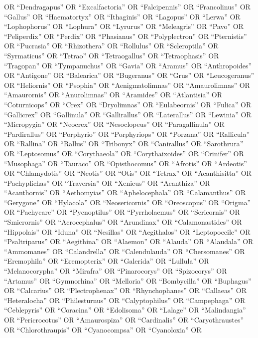 \documentclass[
  number,
  review,
  onecolumn]{elsarticle}
\begin{document}
OR ``Dendragapus'' OR ``Excalfactoria'' OR ``Falcipennis'' OR
``Francolinus'' OR ``Gallus'' OR ``Haematortyx'' OR ``Ithaginis'' OR
``Lagopus'' OR ``Lerwa'' OR ``Lophophorus'' OR ``Lophura'' OR
``Lyrurus'' OR ``Meleagris'' OR ``Pavo'' OR ``Peliperdix'' OR ``Perdix''
OR ``Phasianus'' OR ``Polyplectron'' OR ``Pternistis'' OR ``Pucrasia''
OR ``Rhizothera'' OR ``Rollulus'' OR ``Scleroptila'' OR ``Syrmaticus''
OR ``Tetrao'' OR ``Tetraogallus'' OR ``Tetraophasis'' OR ``Tragopan'' OR
``Tympanuchus'' OR ``Gavia'' OR ``Aramus'' OR ``Anthropoides'' OR
``Antigone'' OR ``Balearica'' OR ``Bugeranus'' OR ``Grus'' OR
``Leucogeranus'' OR ``Heliornis'' OR ``Psophia'' OR ``Aenigmatolimnas''
OR ``Amaurolimnas'' OR ``Amaurornis'' OR ``Anurolimnas'' OR ``Aramides''
OR ``Atlantisia'' OR ``Coturnicops'' OR ``Crex'' OR ``Dryolimnas'' OR
``Eulabeornis'' OR ``Fulica'' OR ``Gallicrex'' OR ``Gallinula'' OR
``Gallirallus'' OR ``Laterallus'' OR ``Lewinia'' OR ``Micropygia'' OR
``Neocrex'' OR ``Nesoclopeus'' OR ``Paragallinula'' OR ``Pardirallus''
OR ``Porphyrio'' OR ``Porphyriops'' OR ``Porzana'' OR ``Rallicula'' OR
``Rallina'' OR ``Rallus'' OR ``Tribonyx'' OR ``Canirallus'' OR
``Sarothrura'' OR ``Leptosomus'' OR ``Corythaeola'' OR
``Corythaixoides'' OR ``Crinifer'' OR ``Musophaga'' OR ``Tauraco'' OR
``Opisthocomus'' OR ``Afrotis'' OR ``Ardeotis'' OR ``Chlamydotis'' OR
``Neotis'' OR ``Otis'' OR ``Tetrax'' OR ``Acanthisitta'' OR
``Pachyplichas'' OR ``Traversia'' OR ``Xenicus'' OR ``Acanthiza'' OR
``Acanthornis'' OR ``Aethomyias'' OR ``Aphelocephala'' OR
``Calamanthus'' OR ``Gerygone'' OR ``Hylacola'' OR ``Neosericornis'' OR
``Oreoscopus'' OR ``Origma'' OR ``Pachycare'' OR ``Pycnoptilus'' OR
``Pyrrholaemus'' OR ``Sericornis'' OR ``Smicrornis'' OR ``Acrocephalus''
OR ``Arundinax'' OR ``Calamonastides'' OR ``Hippolais'' OR ``Iduna'' OR
``Nesillas'' OR ``Aegithalos'' OR ``Leptopoecile'' OR ``Psaltriparus''
OR ``Aegithina'' OR ``Alaemon'' OR ``Alauda'' OR ``Alaudala'' OR
``Ammomanes'' OR ``Calandrella'' OR ``Calendulauda'' OR ``Chersomanes''
OR ``Eremophila'' OR ``Eremopterix'' OR ``Galerida'' OR ``Lullula'' OR
``Melanocorypha'' OR ``Mirafra'' OR ``Pinarocorys'' OR ``Spizocorys'' OR
``Artamus'' OR ``Gymnorhina'' OR ``Melloria'' OR ``Bombycilla'' OR
``Buphagus'' OR ``Calcarius'' OR ``Plectrophenax'' OR ``Rhynchophanes''
OR ``Callaeas'' OR ``Heteralocha'' OR ``Philesturnus'' OR
``Calyptophilus'' OR ``Campephaga'' OR ``Ceblepyris'' OR ``Coracina'' OR
``Edolisoma'' OR ``Lalage'' OR ``Malindangia'' OR ``Pericrocotus'' OR
``Amaurospiza'' OR ``Cardinalis'' OR ``Caryothraustes'' OR
``Chlorothraupis'' OR ``Cyanocompsa'' OR ``Cyanoloxia'' OR
\end{document}
